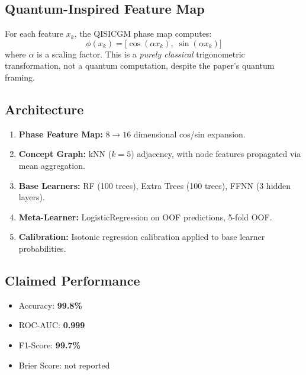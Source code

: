 \documentclass[12pt,a4paper]{article}
\begin{document}
\subsection{Quantum-Inspired Feature Map}
For each feature $x_k$, the QISICGM phase map computes:
\begin{equation}
  \phi(x_k) = \bigl[\cos(\alpha x_k),\; \sin(\alpha x_k)\bigr]
\end{equation}
where $\alpha$ is a scaling factor. This is a \emph{purely classical} trigonometric transformation, not a quantum computation, despite the paper's quantum framing.

\subsection{Architecture}
\begin{enumerate}[leftmargin=*]
  \item \textbf{Phase Feature Map:} $8 \to 16$ dimensional cos/sin expansion.
  \item \textbf{Concept Graph:} kNN ($k=5$) adjacency, with node features propagated via mean aggregation.
  \item \textbf{Base Learners:} RF (100 trees), Extra Trees (100 trees), FFNN (3 hidden layers).
  \item \textbf{Meta-Learner:} LogisticRegression on OOF predictions, 5-fold OOF.
  \item \textbf{Calibration:} Isotonic regression calibration applied to base learner probabilities.
\end{enumerate}

\subsection{Claimed Performance}
\begin{itemize}[leftmargin=*]
  \item Accuracy: \textbf{99.8\%}
  \item ROC-AUC: \textbf{0.999}
  \item F1-Score: \textbf{99.7\%}
  \item Brier Score: not reported
\end{itemize}

\end{document}
